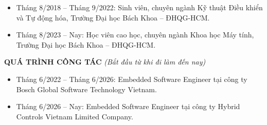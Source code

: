 \vspace{2mm}

\begin{itemize}[leftmargin=*, itemsep=2mm, topsep=0mm]
    \item Tháng 8/2018 -- Tháng 9/2022: Sinh viên, chuyên ngành Kỹ thuật Điều khiển và Tự động hóa, Trường Đại học Bách Khoa -- ĐHQG-HCM.
    \item Tháng 8/2023 -- Nay: Học viên cao học, chuyên ngành Khoa học Máy tính, Trường Đại học Bách Khoa -- ĐHQG-HCM.
\end{itemize}

\vspace{8mm}

\noindent\textbf{QUÁ TRÌNH CÔNG TÁC} \textit{(Bắt đầu từ khi đi làm đến nay)}

\vspace{2mm}

\begin{itemize}[leftmargin=*, itemsep=2mm, topsep=0mm]
    \item Tháng 6/2022 -- Tháng 6/2026: Embedded Software Engineer tại công ty Bosch Global Software Technology Vietnam.
    \item Tháng 6/2026 -- Nay: Embedded Software Engineer tại công ty Hybrid Controls Vietnam Limited Company.
\end{itemize}
